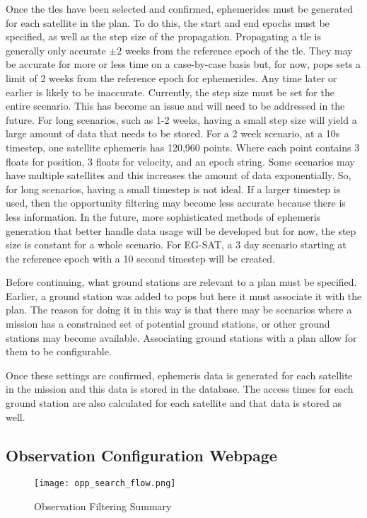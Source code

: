 Once the \glspl{tle} have been selected and confirmed, ephemerides must be
generated for each satellite in the plan. To do this, the start and end epochs
must be specified, as well as the step size of the propagation. Propagating a
\gls{tle} is generally only accurate $\pm 2$ weeks from the reference epoch of
the \gls{tle}. They may be accurate for more or less time on a case-by-case
basis but, for now, \gls{pops} sets a limit of 2 weeks from the reference epoch
for ephemerides. Any time later or earlier is likely to be inaccurate.
Currently, the step size must be set for the entire scenario. This has become
an issue and will need to be addressed in the future. For long scenarios, such
as 1-2 weeks, having a small step size will yield a large amount of data that
needs to be stored. For a 2 week scenario, at a 10s timestep, one satellite
ephemeris has 120,960 points.  Where each point contains 3 floats for position,
3 floats for velocity, and an epoch string. Some scenarios may have multiple
satellites and this increases the amount of data exponentially. So, for long
scenarios, having a small timestep is not ideal. If a larger timestep is used,
then the opportunity filtering may become less accurate because there is less
information. In the future, more sophisticated methods of ephemeris generation
that better handle data usage will be developed but for now, the step size is
constant for a whole scenario. For EG-SAT, a 3 day scenario starting at the
reference epoch with a 10 second timestep will be created. 

Before continuing, what ground stations are relevant to a plan must be
specified.  Earlier, a ground station was added to \gls{pops} but here it must
associate it with the plan. The reason for doing it in this way is that there
may be scenarios where a mission has a constrained set of potential ground
stations, or other ground stations may become available. Associating ground
stations with a plan allow for them to be configurable. 

Once these settings are confirmed, ephemeris data is generated for each
satellite in the mission and this data is stored in the database. The access
times for each ground station are also calculated for each satellite and that
data is stored as well.


\subsection{Observation Configuration Webpage}

\begin{figure}[h]
    \centering
    \texttt{[image: opp\_search\_flow.png]} 
    \caption{Observation Filtering Summary}
    \label{fig:obs_fil} 
\end{figure}

